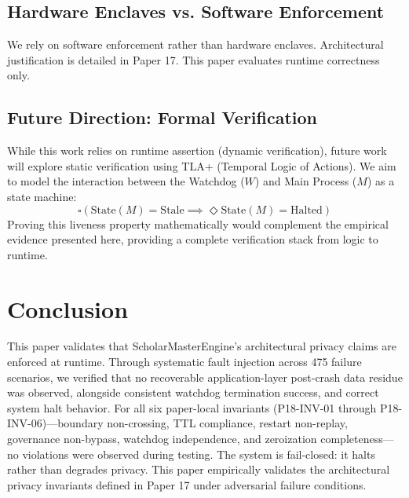 \documentclass[conference]{IEEEtran}
\begin{document}
\subsection{Hardware Enclaves vs. Software Enforcement}
We rely on software enforcement rather than hardware enclaves. Architectural justification is detailed in Paper 17. This paper evaluates runtime correctness only.

\subsection{Future Direction: Formal Verification}
While this work relies on runtime assertion (dynamic verification), future work will explore static verification using TLA+ (Temporal Logic of Actions). We aim to model the interaction between the Watchdog ($W$) and Main Process ($M$) as a state machine:
\begin{equation}
\square (\text{State}(M) = \text{Stale} \implies \Diamond \text{State}(M) = \text{Halted})
\end{equation}
Proving this liveness property mathematically would complement the empirical evidence presented here, providing a complete verification stack from logic to runtime.

\section{Conclusion}

This paper validates that ScholarMasterEngine's architectural privacy claims are enforced at runtime. Through systematic fault injection across 475 failure scenarios, we verified that no recoverable application-layer post-crash data residue was observed, alongside consistent watchdog termination success, and correct system halt behavior. For all six paper-local invariants (P18-INV-01 through P18-INV-06)---boundary non-crossing, TTL compliance, restart non-replay, governance non-bypass, watchdog independence, and zeroization completeness---no violations were observed during testing. The system is fail-closed: it halts rather than degrades privacy. This paper empirically validates the architectural privacy invariants defined in Paper 17 under adversarial failure conditions.
\end{document}
